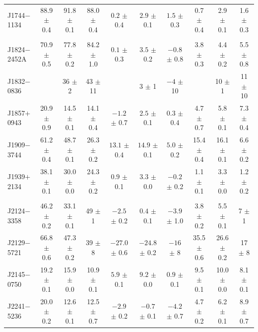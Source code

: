 \documentclass[useAMS,usenatbib]{mn2e}
\begin{document}
\begin{table}
\begin{center}
\begin{tabular}{lccccccccc}
J1744$-$1134& 88.9 $\pm$ 0.4& 91.8 $\pm $ 0.1& 88.0 $\pm$ 0.4&$ 0.2 $ $\pm$ 0.4 &$  2.9$ $\pm$ 0.1 &$  1.5$ $\pm$ 0.3 &  0.7 $\pm$ 0.4 &  2.9 $\pm$ 0.1 & 1.6  $\pm$ 0.3 \\
            &               &                &               &                  &                  &                  &                &                &               \\
J1824$-$2452A& 70.9 $\pm$ 0.5& 77.8 $\pm $ 0.2& 84.2 $\pm$ 1.0&$ 0.1 $ $\pm$ 0.3 &$  3.5$ $\pm$ 0.2 &$ -0.8$ $\pm$ 0.8 &  3.8 $\pm$ 0.3 &  4.4 $\pm$ 0.2 & 5.5  $\pm$ 0.8 \\
J1832$-$0836&               & 36   $\pm $ 2  & 43   $\pm$ 11 &                  &$   3 $ $\pm$ 1   &$   -4$ $\pm$ 10  &                &   10 $\pm$ 1   & 11   $\pm$ 10   \\
J1857$+$0943& 20.9 $\pm$ 0.9& 14.5 $\pm $ 0.1& 14.1 $\pm$ 0.4&$ -1.2$ $\pm$ 0.7 &$  2.5$ $\pm$ 0.1 &$  0.3$ $\pm$ 0.4 &  4.7 $\pm$ 0.7 &  5.8 $\pm$ 0.1 & 7.3  $\pm$ 0.4 \\
J1909$-$3744& 61.2 $\pm$ 0.4& 48.7 $\pm $ 0.1& 26.3 $\pm$ 0.2&$ 13.1$ $\pm$ 0.4 &$ 14.9$ $\pm$ 0.1 &$  5.0$ $\pm$ 0.2 & 15.4 $\pm$ 0.4 & 16.1 $\pm$ 0.1 & 6.6  $\pm$ 0.2 \\
J1939$+$2134& 38.1 $\pm$ 0.1& 30.0 $\pm $ 0.0& 24.3 $\pm$ 0.2&$ 0.9 $ $\pm$ 0.1 &$  3.3$ $\pm$ 0.0 &$ -0.2$ $\pm$ 0.2 &  1.1 $\pm$ 0.1 &  3.3 $\pm$ 0.0 & 1.2  $\pm$ 0.2 \\
            &               &                &               &                  &                  &                  &                &                &               \\
J2124$-$3358& 46.2 $\pm$ 0.2& 33.1 $\pm $ 0.1& 49   $\pm$ 1  &$ -2.5$ $\pm$ 0.2 &$  0.4$ $\pm$ 0.1 &$ -3.9$ $\pm$ 1.0 &  3.8 $\pm$ 0.2 &  5.5 $\pm$ 0.1 & 7    $\pm$ 1   \\
J2129$-$5721& 66.8 $\pm$ 0.6& 47.3 $\pm $ 0.2& 39   $\pm$ 8  &$-27.0$ $\pm$ 0.6 &$-24.8$ $\pm$ 0.2 &$ -16 $ $\pm$ 8   & 35.5 $\pm$ 0.6 & 26.6 $\pm$ 0.2 & 17   $\pm$ 8  \\
J2145$-$0750& 19.2 $\pm$ 0.1& 15.9 $\pm $ 0.0& 10.9 $\pm$ 0.1&$  5.9$ $\pm$ 0.1 &$  9.2$ $\pm$ 0.0 &$  0.9$ $\pm$ 0.1 &  9.5 $\pm$ 0.1 & 10.0 $\pm$ 0.0 & 8.1  $\pm$ 0.1 \\
J2241$-$5236& 20.0 $\pm$ 0.2& 12.6 $\pm $ 0.1& 12.5 $\pm$ 0.7&$ -2.9$ $\pm$ 0.2 &$ -0.7$ $\pm$ 0.1 &$ -4.2$ $\pm$ 0.7 &  4.7 $\pm$ 0.2 &  6.2 $\pm$ 0.1 & 8.9  $\pm$ 0.7 \\
\hline
\end{tabular}
\end{center}
\end{table}
\end{document}
